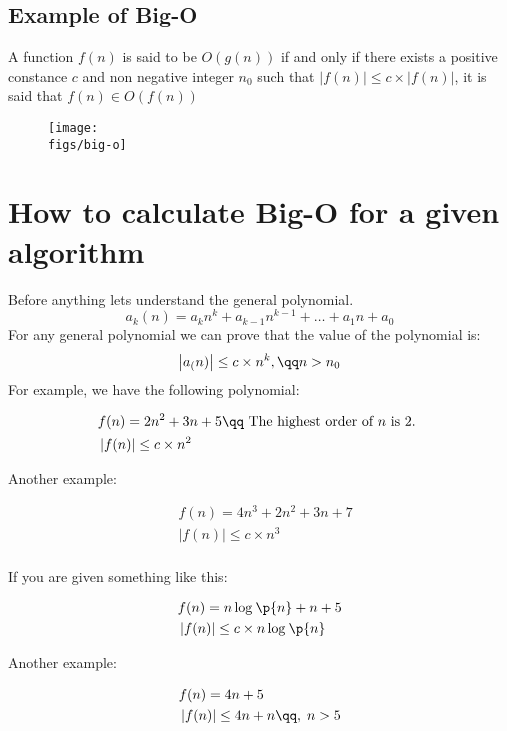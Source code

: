 \subsection{Example of Big-O}
A function $f(n)$ is said to be $O(g(n))$ if and only if there exists a positive constance $c$ and non negative integer $n_0$ such that $\left| f(n) \right| \leq c \times \left| f(n) \right| $, it is said that $f(n) \in O(f(n))$ 
\begin{figure}[H]
    \centering
    \texttt{[image: \\figs/big-o]} 
\end{figure}


\section{How to calculate Big-O for a given algorithm}
Before anything lets understand the general polynomial.
\[
  a_k(n) = a_kn^k+a_{k-1}n^{k-1}+\dots+ a_1n+a_0
\]
For any general polynomial we can prove that the value of the polynomial is: 
\[
  \left| a_(n) \right| \leq c \times n ^k, \qq n > n_0
\]
For example, we have the following polynomial:
\begin{center}
   \begin{align*}
       &f(n) = 2n^2+3n+5 \qq \text{ The highest order of $n$ is 2. }\\ 
       &\left| f(n) \right| \leq c \times n^2 \\ 
   \end{align*}
\end{center}
Another example: 
\begin{center}
   \begin{align*}
       &f(n) = 4n^3 + 2n^2 + 3n +7 \\ 
       &\left| f(n) \right| \leq c \times n^3 \\ 
   \end{align*}
\end{center}
If you are given something like this:
\begin{center}
   \begin{align*}
        &f(n) = n\log_{}\p{ n } +n+5 \\ 
        &\left| f(n) \right| \leq c \times n \log_{}\p{ n } \\ 
   \end{align*}
\end{center}
Another example: 
\begin{center}
   \begin{align*}
       &f(n) = 4n +5 \\ 
       &\left| f(n) \right| \leq 4n+n \qq,\; n > 5 \\ 
   \end{align*}
\end{center}

